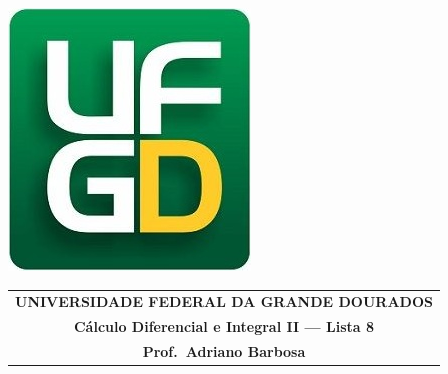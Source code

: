 \documentclass[a4paper,5pt]{amsbook}
\begin{document}
\thispagestyle{empty}
\pagestyle{empty}
\begin{minipage}[h]{0.14\textwidth}
    \includegraphics[scale=0.24]{../../ufgd.png}
\end{minipage}
\begin{minipage}[h]{\textwidth}
    \begin{tabular}{c}
        {{\bf UNIVERSIDADE FEDERAL DA GRANDE DOURADOS}}\\
        {{\bf C\'{a}lculo Diferencial e Integral II --- Lista 8}}\\
        {{\bf Prof.\ Adriano Barbosa}}\\
    \end{tabular}
    \vspace{-0.45cm}
\end{minipage}

\end{document}

